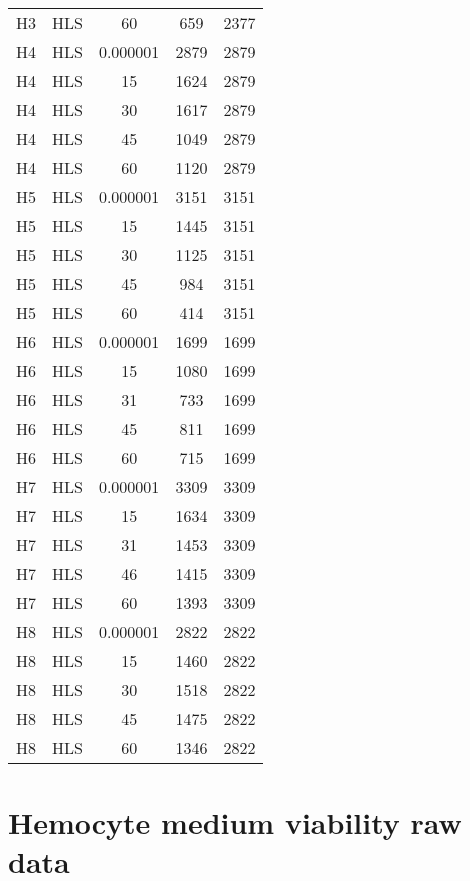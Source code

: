 \begin{center}
\begin{longtable}{ccccc}
H3	&	HLS	&	60	&	659	&	2377	\\
H4	&	HLS	&	0.000001	&	2879	&	2879	\\
H4	&	HLS	&	15	&	1624	&	2879	\\
H4	&	HLS	&	30	&	1617	&	2879	\\
H4	&	HLS	&	45	&	1049	&	2879	\\
H4	&	HLS	&	60	&	1120	&	2879	\\
H5	&	HLS	&	0.000001	&	3151	&	3151	\\
H5	&	HLS	&	15	&	1445	&	3151	\\
H5	&	HLS	&	30	&	1125	&	3151	\\
H5	&	HLS	&	45	&	984	&	3151	\\
H5	&	HLS	&	60	&	414	&	3151	\\
H6	&	HLS	&	0.000001	&	1699	&	1699	\\
H6	&	HLS	&	15	&	1080	&	1699	\\
H6	&	HLS	&	31	&	733	&	1699	\\
H6	&	HLS	&	45	&	811	&	1699	\\
H6	&	HLS	&	60	&	715	&	1699	\\
H7	&	HLS	&	0.000001	&	3309	&	3309	\\
H7	&	HLS	&	15	&	1634	&	3309	\\
H7	&	HLS	&	31	&	1453	&	3309	\\
H7	&	HLS	&	46	&	1415	&	3309	\\
H7	&	HLS	&	60	&	1393	&	3309	\\
H8	&	HLS	&	0.000001	&	2822	&	2822	\\
H8	&	HLS	&	15	&	1460	&	2822	\\
H8	&	HLS	&	30	&	1518	&	2822	\\
H8	&	HLS	&	45	&	1475	&	2822	\\
H8	&	HLS	&	60	&	1346	&	2822	\\
\end{longtable}    
\end{center}

\pagebreak


\section{Hemocyte medium viability raw data}

